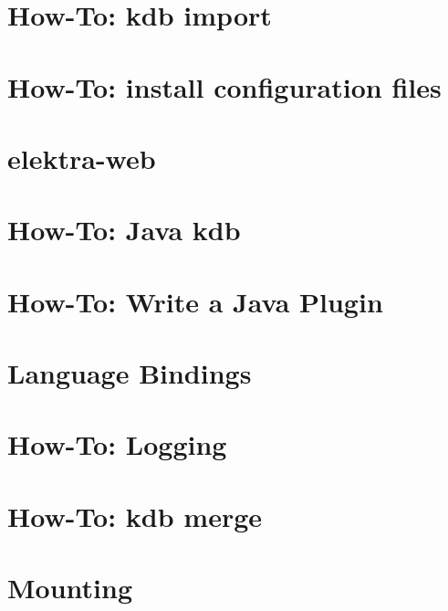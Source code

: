 \let\mypdfximage\pdfximage\def\pdfximage{\immediate\mypdfximage}\documentclass[twoside]{book}
\newcommand{\+}{\discretionary{\mbox{\scriptsize$\hookleftarrow$}}{}{}}
\begin{document}
\chapter{How-\/\+To\+: kdb import}
\label{doc_tutorials_import_md}

\chapter{How-\/\+To\+: install configuration files}
\label{doc_tutorials_install-config-files_md}

\chapter{elektra-\/web}
\label{doc_tutorials_install-webui_md}

\chapter{How-\/\+To\+: Java kdb}
\label{doc_tutorials_java-kdb_md}

\chapter{How-\/\+To\+: Write a Java Plugin}
\label{doc_tutorials_java-plugins_md}

\chapter{Language Bindings}
\label{doc_tutorials_language-bindings_md}

\chapter{How-\/\+To\+: Logging}
\label{doc_tutorials_logger_md}

\chapter{How-\/\+To\+: kdb merge}
\label{doc_tutorials_merge_md}

\chapter{Mounting}
\label{doc_tutorials_mount_md}

\end{document}
